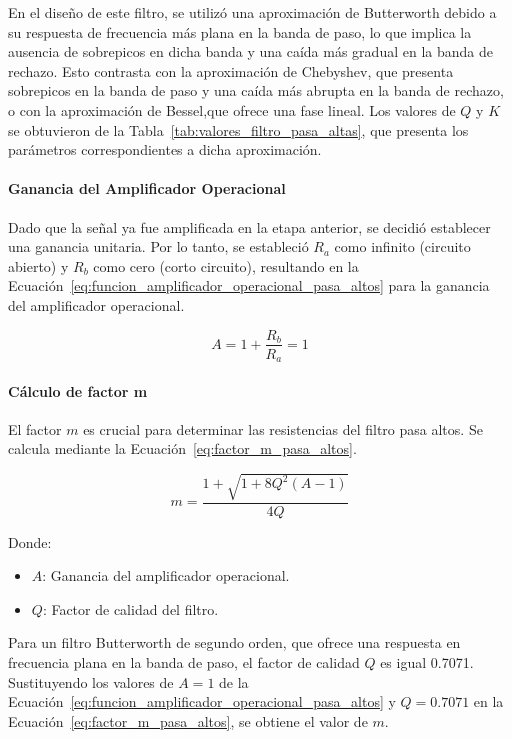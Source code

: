         En el diseño de este filtro, se utilizó una aproximación de Butterworth debido a su respuesta de frecuencia más plana en la banda de paso, lo que implica la ausencia de sobrepicos en dicha banda y una caída más gradual en la banda de rechazo. Esto contrasta con la aproximación de Chebyshev, que presenta sobrepicos en la banda de paso y una caída más abrupta en la banda de rechazo, o con la aproximación de Bessel,que  ofrece una fase lineal. Los valores de $Q$ y $K$ se obtuvieron de la Tabla~\ref{tab:valores_filtro_pasa_altas}, que presenta los parámetros correspondientes a dicha aproximación.

        \paragraph{Ganancia del Amplificador Operacional}
        Dado que la señal ya fue amplificada en la etapa anterior, se decidió establecer una ganancia unitaria. Por lo tanto, se estableció $R_a$ como infinito (circuito abierto) y $R_b$ como cero (corto circuito), resultando en la Ecuación~\ref{eq:funcion_amplificador_operacional_pasa_altos} para la ganancia del amplificador operacional.

        \begin{equation}
            \label{eq:funcion_amplificador_operacional_pasa_altos}
            A = 1 + \frac{R_b}{R_a} = 1
        \end{equation}

        \paragraph{Cálculo de factor m}
        El factor $m$ es crucial para determinar las resistencias del filtro pasa altos. Se calcula mediante la Ecuación~\ref{eq:factor_m_pasa_altos}.

        \begin{equation}
            \label{eq:factor_m_pasa_altos}
            m = \frac{1+\sqrt{1+8Q^2(A-1)}}{4Q}
        \end{equation}

        Donde:
        \begin{itemize}
            \item $A$: Ganancia del amplificador operacional.
            \item $Q$: Factor de calidad del filtro.
        \end{itemize}

        Para un filtro Butterworth de segundo orden, que ofrece una respuesta en frecuencia plana en la banda de paso, el factor de calidad $Q$ es igual 0.7071. Sustituyendo los valores de $A = 1$ de la Ecuación~\ref{eq:funcion_amplificador_operacional_pasa_altos} y $Q = 0.7071$ en la Ecuación~\ref{eq:factor_m_pasa_altos}, se obtiene el valor de $m$.

